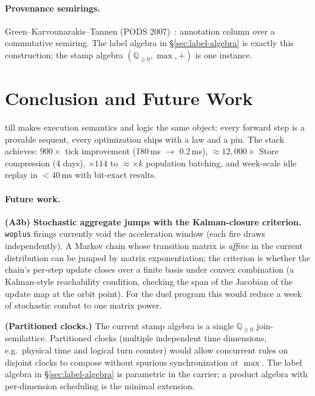 \documentclass[11pt]{article}
\newcommand{\Qnn}{\mathbb{Q}_{\geq 0}}
\theoremstyle{remark}
\begin{document}
\paragraph{Provenance semirings.}
Green--Karvounarakis--Tannen (PODS 2007)~\cite{GreenKarvounarakisTannen07}:
annotation column over a commutative semiring.  The label algebra in
\S\ref{sec:label-algebra} is exactly this construction; the stamp algebra
$(\Qnn, \max, +)$ is one instance.

\section{Conclusion and Future Work}
\label{sec:conclusion}

till makes execution semantics and logic the same object: every forward step is a
provable sequent, every optimization ships with a law and a pin.  The stack
achieves: $900\times$ tick improvement (180\,ms $\to$ 0.2\,ms), $\approx
12{,}000\times$ Store compression (4 days), $\times 114$ to $\approx \times k$
population batching, and week-scale idle replay in $<40\,\text{ms}$ with
bit-exact results.

\paragraph{Future work.}

\textbf{(A3b) Stochastic aggregate jumps with the Kalman-closure criterion.}
\texttt{woplus} firings currently void the acceleration window (each fire draws
independently).  A Markov chain whose transition matrix is \emph{affine} in the
current distribution can be jumped by matrix exponentiation; the criterion is
whether the chain's per-step update closes over a finite basis under convex
combination (a Kalman-style reachability condition, checking the span of the
Jacobian of the update map at the orbit point).  For the duel program this would
reduce a week of stochastic combat to one matrix power.

\textbf{(Partitioned clocks.)} The current stamp algebra is a single $\Qnn$
join-semilattice.  Partitioned clocks (multiple independent time dimensions,
e.g.\ physical time and logical turn counter) would allow concurrent rules on
disjoint clocks to compose without spurious synchronization at $\max$.  The label
algebra in \S\ref{sec:label-algebra} is parametric in the carrier; a product
algebra with per-dimension scheduling is the minimal extension.
\end{document}
